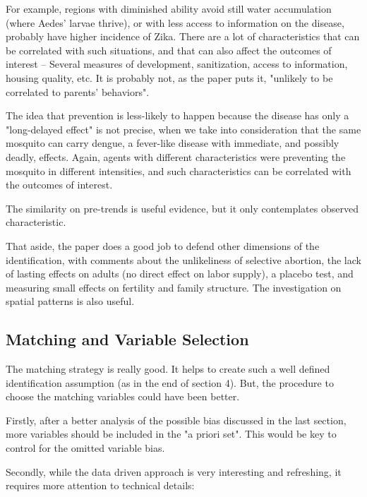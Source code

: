 \documentclass[12pt]{article}
\begin{document}
For example, regions with diminished ability avoid still water accumulation (where Aedes' larvae thrive), or with less access to information on the disease, probably have higher incidence of Zika. There are a lot of characteristics that can be correlated with such situations, and that can also affect the outcomes of interest -- Several measures of development, sanitization, access to information, housing quality, etc. It is probably not, as the paper puts it, "unlikely to be correlated to parents' behaviors".

The idea that prevention is less-likely to happen because the disease has only a "long-delayed effect" is not precise, when we take into consideration that the same mosquito can carry dengue, a fever-like disease with immediate, and possibly deadly, effects. Again, agents with different characteristics were preventing the mosquito in different intensities, and such characteristics can be correlated with the outcomes of interest.

The similarity on pre-trends is useful evidence, but it only contemplates observed characteristic.

That aside, the paper does a good job to defend other dimensions of the identification, with comments about the unlikeliness of selective abortion, the lack of lasting effects on adults (no direct effect on labor supply), a placebo test, and measuring small effects on fertility and family structure. The investigation on spatial patterns is also useful.


\subsection{Matching and Variable Selection}

The matching strategy is really good. It helps to create such a well defined identification assumption (as in the end of section 4). But, the procedure to choose the matching variables could have been better.

Firstly, after a better analysis of the possible bias discussed in the last section, more variables should be included in the "a priori set". This would be key to control for the omitted variable bias.

Secondly, while the data driven approach is very interesting and refreshing, it requires more attention to technical details:
\end{document}
